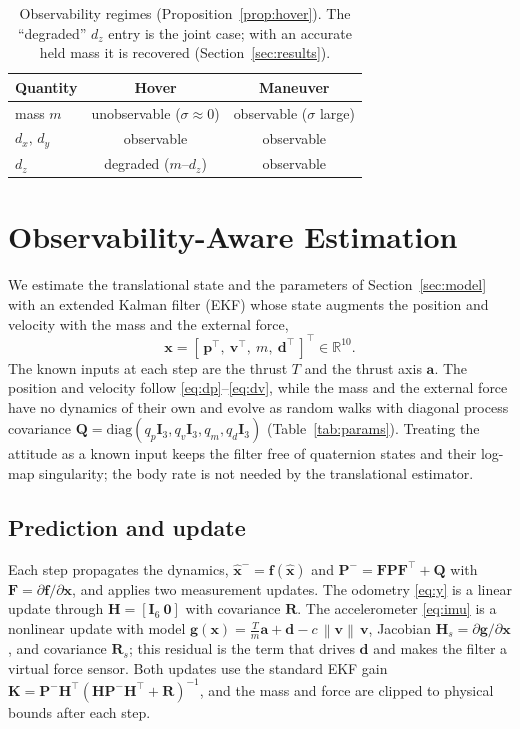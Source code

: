 \documentclass[lettersize,journal]{IEEEtran}
\newcommand{\R}{\mathbb{R}}
\newcommand{\norm}[1]{\left\| #1 \right\|}
\newcommand{\vect}[1]{\bm{#1}}
\newcommand{\mat}[1]{\mathbf{#1}}
\begin{document}
\begin{table}[t]
\centering
\caption{Observability regimes (Proposition~\ref{prop:hover}). The ``degraded''
$d_z$ entry is the joint case; with an accurate held mass it is recovered
(Section~\ref{sec:results}).}
\label{tab:obs}
\begin{tabular}{lcc}
\toprule
Quantity & Hover & Maneuver \\
\midrule
mass $m$        & unobservable ($\sigma\!\approx\!0$)         & observable ($\sigma$ large) \\
$d_x,\,d_y$     & observable                                  & observable \\
$d_z$           & degraded ($m$--$d_z$)                       & observable \\
\bottomrule
\end{tabular}
\end{table}

\section{Observability-Aware Estimation}\label{sec:mhe}

We estimate the translational state and the parameters of
Section~\ref{sec:model} with an extended Kalman filter (EKF) whose state augments
the position and velocity with the mass and the external force,
\begin{equation}
\vect{x}=[\,\vect{p}^{\!\top},\ \vect{v}^{\!\top},\ m,\ \vect{d}^{\!\top}\,]^{\!\top}\in\R^{10}.
\label{eq:state}
\end{equation}
The known inputs at each step are the thrust $T$ and the thrust axis $\vect{a}$.
The position and velocity follow \eqref{eq:dp}--\eqref{eq:dv}, while the mass and
the external force have no dynamics of their own and evolve as random walks with
diagonal process covariance $\mat{Q}=\mathrm{diag}(q_p\mat{I}_3,q_v\mat{I}_3,q_m,q_d\mat{I}_3)$
(Table~\ref{tab:params}). Treating the
attitude as a known input keeps the filter free of quaternion states and their
log-map singularity; the body rate is not needed by the translational estimator.

\subsection{Prediction and update}
Each step propagates the dynamics, $\hat{\vect{x}}^-=\vect{f}(\hat{\vect{x}})$
and $\mat{P}^-=\mat{F}\mat{P}\mat{F}^{\!\top}+\mat{Q}$ with
$\mat{F}=\partial\vect{f}/\partial\vect{x}$, and applies two measurement updates.
The odometry \eqref{eq:y} is a linear update through
$\mat{H}=[\mat{I}_6\ \mat{0}]$ with covariance $\mat{R}$. The accelerometer
\eqref{eq:imu} is a nonlinear update with model
$\vect{g}(\vect{x})=\tfrac{T}{m}\vect{a}+\vect{d}-c\,\norm{\vect{v}}\,\vect{v}$,
Jacobian $\mat{H}_s=\partial\vect{g}/\partial\vect{x}$, and covariance
$\mat{R}_s$; this residual is the term that drives $\vect{d}$ and makes the
filter a virtual force sensor. Both updates use the standard EKF gain
$\mat{K}=\mat{P}^-\mat{H}^{\!\top}(\mat{H}\mat{P}^-\mat{H}^{\!\top}+\mat{R})^{-1}$,
and the mass and force are clipped to physical bounds after each step.
\end{document}
